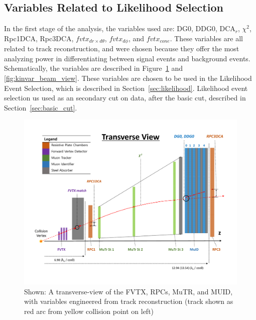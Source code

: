 \subsection{Variables Related to Likelihood Selection}

In the first stage of the analysis, the variables used are: DG0, DDG0, DCA$_r$,
$\chi^2$, Rpc1DCA, Rpc3DCA, $fvtx_{dr \times d\theta}$, $fvtx_{d\phi}$, and
$fvtx_{cone}$. These variables are all related to track reconstruction, and were
chosen because they offer the most analyzing power in differentiating between
signal events and background events. Schematically, the variables are described
in Figure~\ref{fig:kinvar_side_view} and \ref{fig:kinvar_beam_view}. These
variables are chosen to be used in the Likelihood Event Selection, which is
described in Section~\ref{sec:likelihood}. Likelihood event selection us used as
an secondary cut on data, after the basic cut, described in
Section~\ref{sec:basic_cut}.

\begin{figure}[ht]
  \centering
  \includegraphics[width=\textwidth]{./figures/kinvar_side_view.pdf}
  \caption{
    Shown: A transverse-view of the FVTX, RPCs, MuTR, and MUID, with
    variables engineered from track reconstruction (track shown as red arc from
    yellow collision point on left)~\cite{Kim2016}
  }
  \label{fig:kinvar_side_view}
\end{figure}
    
